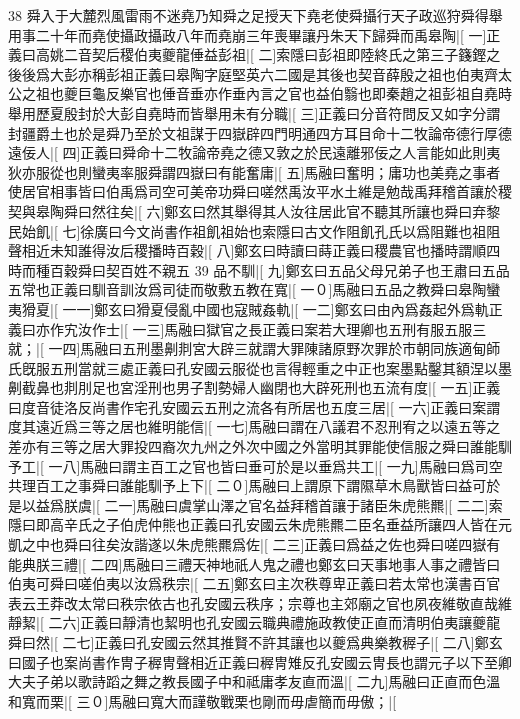 38
舜入于大麓烈風雷雨不迷堯乃知舜之足授天下堯老使舜攝行天子政巡狩舜得舉用事二十年而堯使攝政攝政八年而堯崩三年喪畢讓丹朱天下歸舜而禹皋陶|[%
一]正義曰高姚二音契后稷伯夷夔龍倕益彭祖|[%
二]索隱曰彭祖即陸終氏之第三子籛鏗之後後爲大彭亦稱彭祖正義曰皋陶字庭堅英六二國是其後也契音薛殷之祖也伯夷齊太公之祖也夔巨龜反樂官也倕音垂亦作垂內言之官也益伯翳也即秦趙之祖彭祖自堯時舉用歷夏殷封於大彭自堯時而皆舉用未有分職|[%
三]正義曰分音符問反又如字分謂封疆爵土也於是舜乃至於文祖謀于四嶽辟四門明通四方耳目命十二牧論帝德行厚德遠佞人|[%
四]正義曰舜命十二牧論帝堯之德又敦之於民遠離邪佞之人言能如此則夷狄亦服從也則蠻夷率服舜謂四嶽曰有能奮庸|[%
五]馬融曰奮明；庸功也美堯之事者使居官相事皆曰伯禹爲司空可美帝功舜曰嗟然禹汝平水土維是勉哉禹拜稽首讓於稷契與皋陶舜曰然往矣|[%
六]鄭玄曰然其舉得其人汝往居此官不聽其所讓也舜曰弃黎民始飢|[%
七]徐廣曰今文尚書作祖飢祖始也索隱曰古文作阻飢孔氏以爲阻難也祖阻聲相近未知誰得汝后稷播時百穀|[%
八]鄭玄曰時讀曰蒔正義曰稷農官也播時謂順四時而種百穀舜曰契百姓不親五
39
品不馴|[%
九]鄭玄曰五品父母兄弟子也王肅曰五品五常也正義曰馴音訓汝爲司徒而敬敷五教在寬|[%
一０]馬融曰五品之教舜曰皋陶蠻夷猾夏|[%
一一]鄭玄曰猾夏侵亂中國也寇賊姦軌|[%
一二]鄭玄曰由內爲姦起外爲軌正義曰亦作宄汝作士|[%
一三]馬融曰獄官之長正義曰案若大理卿也五刑有服五服三就；|[%
一四]馬融曰五刑墨劓剕宮大辟三就謂大罪陳諸原野次罪於市朝同族適甸師氏旣服五刑當就三處正義曰孔安國云服從也言得輕重之中正也案墨點鑿其額涅以墨劓截鼻也剕刖足也宮淫刑也男子割勢婦人幽閉也大辟死刑也五流有度|[%
一五]正義曰度音徒洛反尚書作宅孔安國云五刑之流各有所居也五度三居|[%
一六]正義曰案謂度其遠近爲三等之居也維明能信|[%
一七]馬融曰謂在八議君不忍刑宥之以遠五等之差亦有三等之居大罪投四裔次九州之外次中國之外當明其罪能使信服之舜曰誰能馴予工|[%
一八]馬融曰謂主百工之官也皆曰垂可於是以垂爲共工|[%
一九]馬融曰爲司空共理百工之事舜曰誰能馴予上下|[%
二０]馬融曰上謂原下謂隰草木鳥獸皆曰益可於是以益爲朕虞|[%
二一]馬融曰虞掌山澤之官名益拜稽首讓于諸臣朱虎熊羆|[%
二二]索隱曰即高辛氏之子伯虎仲熊也正義曰孔安國云朱虎熊羆二臣名垂益所讓四人皆在元凱之中也舜曰往矣汝諧遂以朱虎熊羆爲佐|[%
二三]正義曰爲益之佐也舜曰嗟四嶽有能典朕三禮|[%
二四]馬融曰三禮天神地祇人鬼之禮也鄭玄曰天事地事人事之禮皆曰伯夷可舜曰嗟伯夷以汝爲秩宗|[%
二五]鄭玄曰主次秩尊卑正義曰若太常也漢書百官表云王莽改太常曰秩宗依古也孔安國云秩序；宗尊也主郊廟之官也夙夜維敬直哉維靜絜|[%
二六]正義曰靜清也絜明也孔安國云職典禮施政教使正直而清明伯夷讓夔龍舜曰然|[%
二七]正義曰孔安國云然其推賢不許其讓也以夔爲典樂教稺子|[%
二八]鄭玄曰國子也案尚書作冑子稺冑聲相近正義曰稺冑雉反孔安國云冑長也謂元子以下至卿大夫子弟以歌詩蹈之舞之教長國子中和祗庸孝友直而溫|[%
二九]馬融曰正直而色溫和寬而栗|[%
三０]馬融曰寬大而謹敬戰栗也剛而毋虐簡而毋傲；|[%
